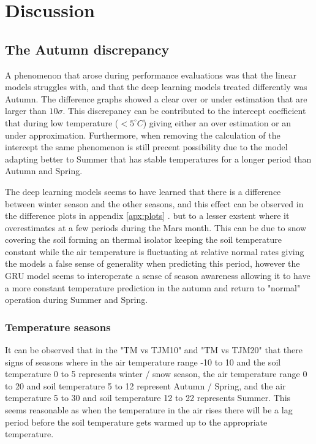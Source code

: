 \section{Discussion}\label{sec:discussion}

\subsection{The Autumn discrepancy}\label{sec:autumn}

A phenomenon that arose during performance evaluations was that the linear models struggles with, and that the deep learning models treated differently was Autumn. The difference graphs showed a clear over or under estimation that are larger than $10\sigma$. This discrepancy can be contributed to the intercept coefficient that during low temperature ($<5^\circ C$) giving either an over estimation or an under approximation. Furthermore, when removing the calculation of the intercept the same phenomenon is still precent possibility due to the model adapting better to Summer that has stable temperatures for a longer period than Autumn and Spring.

The deep learning models seems to have learned that there is a difference between winter season and the other seasons, and this effect can be observed in the difference plots in appendix \ref{apx:plots} .  but to a lesser exstent where it overestimates at a few periods during the Mars month. This can be due to snow covering the soil forming an thermal isolator keeping the soil temperature constant while the air temperature is fluctuating at relative normal rates giving the models a false sense of generality when predicting this period, however the GRU model seems to interoperate a sense of season awareness allowing it to have a more constant temperature prediction in the autumn and return to "normal" operation during Summer and Spring. 

\subsubsection{Temperature seasons}

It can be observed that in the "TM vs TJM10" and "TM vs TJM20" that there signs of seasons where in the air temperature range -10 to 10 and the soil temperature 0 to 5 represents winter / snow season, the air temperature range 0 to 20 and soil temperature 5 to 12 represent Autumn / Spring, and the air temperature 5 to 30 and soil temperature 12 to 22 represents Summer. This seems reasonable as when the temperature in the air rises there will be a lag period before the soil temperature gets warmed up to the appropriate temperature. 


